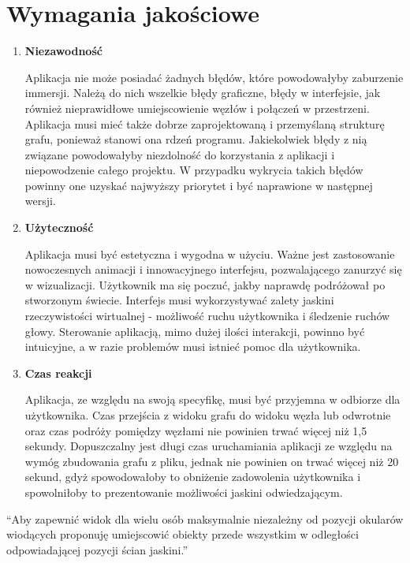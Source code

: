 \section{Wymagania jakościowe}
\begin{enumerate}[label=\textbullet]
\item \textbf{Niezawodność}

Aplikacja nie może posiadać żadnych błędów, które powodowałyby zaburzenie immersji. Należą do nich wszelkie błędy graficzne, błędy w interfejsie, jak również nieprawidłowe umiejscowienie węzłów i połączeń w przestrzeni. Aplikacja musi mieć także dobrze zaprojektowaną i przemyślaną strukturę grafu, ponieważ stanowi ona rdzeń programu. Jakiekolwiek błędy z nią związane powodowałyby niezdolność do korzystania z aplikacji i niepowodzenie całego projektu. W przypadku wykrycia takich błędów powinny one uzyskać najwyższy priorytet i być naprawione w następnej wersji.

\item \textbf{Użyteczność}

Aplikacja musi być estetyczna i wygodna w użyciu. Ważne jest zastosowanie nowoczesnych animacji i innowacyjnego interfejsu, pozwalającego zanurzyć się w wizualizacji. Użytkownik ma się poczuć, jakby naprawdę podróżował po stworzonym świecie. Interfejs musi wykorzystywać zalety jaskini rzeczywistości wirtualnej - możliwość ruchu użytkownika i śledzenie ruchów głowy. Sterowanie aplikacją, mimo dużej ilości interakcji, powinno być intuicyjne, a w razie problemów musi istnieć pomoc dla użytkownika.

\item \textbf{Czas reakcji}

Aplikacja, ze względu na swoją specyfikę, musi być przyjemna w odbiorze dla użytkownika. Czas przejścia z widoku grafu do widoku węzła lub odwrotnie oraz czas podróży pomiędzy węzłami nie powinien trwać więcej niż 1,5 sekundy. Dopuszczalny jest długi czas uruchamiania aplikacji ze względu na wymóg zbudowania grafu z pliku, jednak nie powinien on trwać więcej niż 20 sekund, gdyż spowodowałoby to obniżenie zadowolenia użytkownika i spowolniłoby to prezentowanie możliwości jaskini odwiedzającym. 
\end{enumerate}

“Aby zapewnić widok dla wielu osób maksymalnie niezależny od pozycji okularów wiodących proponuję umiejscowić obiekty przede wszystkim w odległości odpowiadającej pozycji ścian jaskini.”
